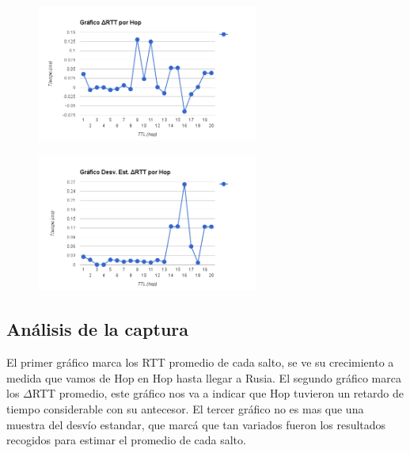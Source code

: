 \begin{figure}[h]
    \includegraphics[width=0.65\textwidth]{img_analisis1/delta_rtt_hop.png}
    
\end{figure}
\vspace{0.25cm}

\begin{figure}[h]
    \includegraphics[width=0.65\textwidth]{img_analisis1/ds_delta_rtt_hop.png}
    
\end{figure}
\vspace{0.25cm}

\newpage

\subsection{An\'alisis de la captura}

El primer gráfico marca los RTT promedio de cada salto, se ve su crecimiento a medida que vamos de Hop en Hop hasta llegar a Rusia. El segundo gráfico marca los $\Delta$RTT promedio, este gráfico nos va a indicar que Hop tuvieron un retardo de tiempo considerable con su antecesor. El tercer gráfico no es mas que una muestra del desvío estandar, que marcá que tan variados fueron los resultados recogidos para estimar el promedio de cada salto.

